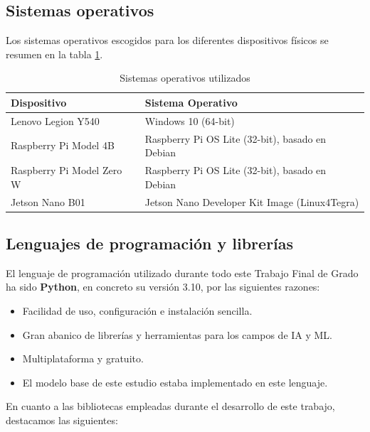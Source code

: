 \documentclass[00-Trabajo_Final.tex]{subfiles}
\begin{document}
\subsection{Sistemas operativos}

Los sistemas operativos escogidos para los diferentes dispositivos físicos se resumen en la tabla \ref{tab:sistemas_operativos}.

\begin{table}[H]
    \centering
\begin{tabular}{ll}
\hline
Dispositivo               & Sistema Operativo               \\ \hline
Lenovo Legion Y540        & Windows 10 (64-bit)             \\
Raspberry Pi Model 4B     & Raspberry Pi OS Lite (32-bit), basado en Debian \\
Raspberry Pi Model Zero W & Raspberry Pi OS Lite (32-bit), basado en Debian \\
Jetson Nano B01           & Jetson Nano Developer Kit Image (Linux4Tegra) \\ \hline
\end{tabular}
    \caption{Sistemas operativos utilizados}
    \label{tab:sistemas_operativos}
\end{table}

\subsection{Lenguajes de programación y librerías}

El lenguaje de programación utilizado durante todo este Trabajo Final de Grado ha sido \textbf{Python}, en concreto su versión 3.10, por las siguientes razones:

\begin{itemize}[noitemsep,topsep=5pt]
    \item Facilidad de uso, configuración e instalación sencilla.
    \item Gran abanico de librerías y herramientas para los campos de IA y ML.
    \item Multiplataforma y gratuito.
    \item El modelo base de este estudio estaba implementado en este lenguaje.
\end{itemize}

En cuanto a las bibliotecas empleadas durante el desarrollo de este trabajo, destacamos las siguientes:
\end{document}
